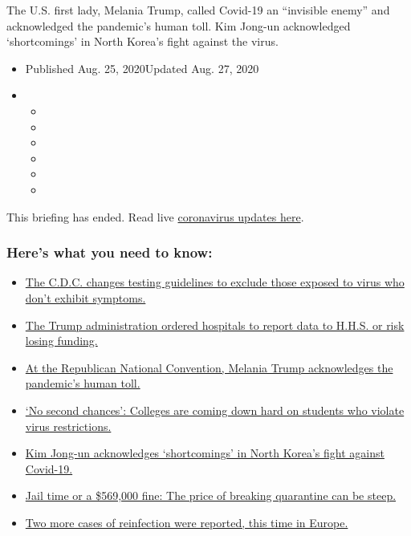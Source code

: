 The U.S. first lady, Melania Trump, called Covid-19 an ``invisible
enemy'' and acknowledged the pandemic's human toll. Kim Jong-un
acknowledged `shortcomings' in North Korea's fight against the virus.

\begin{itemize}
\item
  Published Aug. 25, 2020Updated Aug. 27, 2020
\item
  \begin{itemize}
  \item
  \item
  \item
  \item
  \item
  \item
  \end{itemize}
\end{itemize}

This briefing has ended. Read live
\href{https://www.nytimes3xbfgragh.onion/2020/08/27/world/covid-19-coronavirus.html}{coronavirus
updates here}.

\hypertarget{heres-what-you-need-to-know}{%
\subsubsection{Here's what you need to
know:}\label{heres-what-you-need-to-know}}

\begin{itemize}
\tightlist
\item
  \protect\hyperlink{link-3ff60f07}{The C.D.C. changes testing
  guidelines to exclude those exposed to virus who don't exhibit
  symptoms.}
\item
  \protect\hyperlink{link-56c08b41}{The Trump administration ordered
  hospitals to report data to H.H.S. or risk losing funding.}
\item
  \protect\hyperlink{link-1ba221ee}{At the Republican National
  Convention, Melania Trump acknowledges the pandemic's human toll.}
\item
  \protect\hyperlink{link-42aca3e1}{`No second chances': Colleges are
  coming down hard on students who violate virus restrictions.}
\item
  \protect\hyperlink{link-464ce7c5}{Kim Jong-un acknowledges
  `shortcomings' in North Korea's fight against Covid-19.}
\item
  \protect\hyperlink{link-6ad04efb}{Jail time or a \$569,000 fine: The
  price of breaking quarantine can be steep.}
\item
  \protect\hyperlink{link-f61c099}{Two more cases of reinfection were
  reported, this time in Europe.}
\end{itemize}


